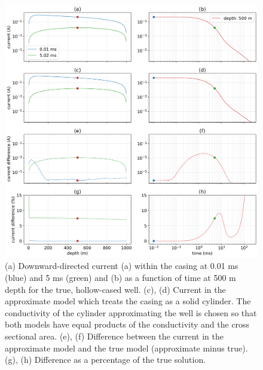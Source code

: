 \begin{figure}
    \begin{center}
    \includegraphics[width=\textwidth]{figures/em_casing/approx_casing_currents.png}
    \end{center}
\caption{
    (a) Downward-directed current (a) within the casing at 0.01 ms (blue) and 5 ms (green)
    and (b) as a function of time at 500 m depth for the true, hollow-cased well.
    (c), (d) Current in the approximate model which treats the casing as a solid cylinder.
     The conductivity of the cylinder approximating the well is chosen so that both models have
    equal products of the conductivity and the cross sectional area.
    (e), (f) Difference between the current in the approximate model and the true model (approximate minus true).
    (g), (h) Difference as a percentage of the true solution.
}
\label{fig:approx_casing_currents}
\end{figure}



